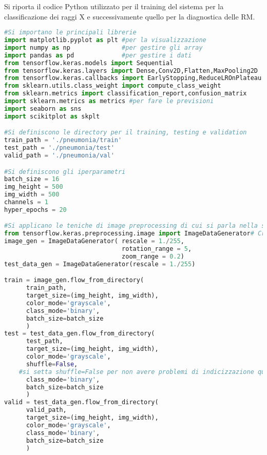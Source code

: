 Si riporta il codice Python utilizzato per il training del sistema per la classificazione dei raggi X e successivamente quello per la diagnostica delle RM.

\begin{lstlisting}[basicstyle=\tiny, language=Python, caption=Esempio di implementazione di una CNN per la classificazione di raggi-X.~\cite{dspneum} ]
#Si importano le principali librerie
import matplotlib.pyplot as plt #per la visualizzazione
import numpy as np              #per gestire gli array
import pandas as pd             #per gestire i dati
from tensorflow.keras.models import Sequential
from tensorflow.keras.layers import Dense,Conv2D,Flatten,MaxPooling2D
from tensorflow.keras.callbacks import EarlyStopping,ReduceLROnPlateau
from sklearn.utils.class_weight import compute_class_weight
from sklearn.metrics import classification_report,confusion_matrix
import sklearn.metrics as metrics #per fare le previsioni
import seaborn as sns 
import scikitplot as skplt

#Si definiscono le directory per il training, testing e validation
train_path = './pneumonia/train'
test_path = './pneumonia/test'
valid_path = './pneumonia/val'

#Si definiscono gli iperparametri
batch_size = 16
img_height = 500
img_width = 500
channels = 1
hyper_epochs = 20

#Si applicano le teniche di image preprocessing di cui si parla nella sezione 5.2.5 al set di training e testin
from tensorflow.keras.preprocessing.image import ImageDataGenerator# Create Image Data Generator for Train Set
image_gen = ImageDataGenerator( rescale = 1./255,
                                rotation_range = 5,
                                zoom_range = 0.2)                            
test_data_gen = ImageDataGenerator(rescale = 1./255)

train = image_gen.flow_from_directory(
      train_path,
      target_size=(img_height, img_width),
      color_mode='grayscale',
      class_mode='binary',
      batch_size=batch_size
      )
test = test_data_gen.flow_from_directory(
      test_path,
      target_size=(img_height, img_width),
      color_mode='grayscale',
      shuffle=False, 
    #si setta shuffle=False per non avere problemi di indicizzazione quando si va a fare il test
      class_mode='binary',
      batch_size=batch_size
      )
valid = test_data_gen.flow_from_directory(
      valid_path,
      target_size=(img_height, img_width),
      color_mode='grayscale',
      class_mode='binary', 
      batch_size=batch_size
      )


\end{lstlisting}
